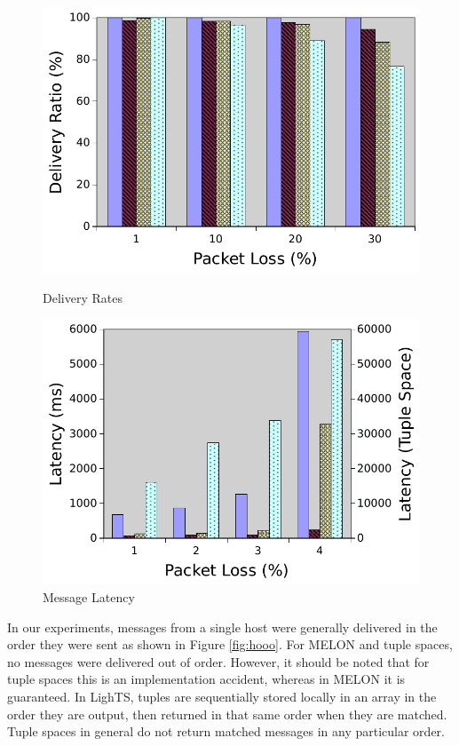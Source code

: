 \documentclass{llncs}
\begin{document}
\begin{figure}[ht]
\centering
\begin{minipage}[b]{0.48\linewidth}
\includegraphics[width = \textwidth]{figures/delivery.pdf}
\caption{Delivery Rates}
\label{fig:delivery}
\end{minipage}
\quad
\begin{minipage}[b]{0.48\linewidth}
\includegraphics[width = \textwidth]{figures/latency.pdf}
\caption{Message Latency}
\label{fig:latency}
\end{minipage}
\end{figure}

In our experiments, messages from a single host were generally delivered in the order they were sent as shown in Figure \ref{fig:hooo}. For MELON and tuple spaces, no messages were delivered out of order. However, it should be noted that for tuple spaces this is an implementation accident, whereas in MELON it is guaranteed. In LighTS, tuples are sequentially stored locally in an array in the order they are output, then returned in that same order when they are matched. Tuple spaces in general do not return matched messages in any particular order.
\end{document}
